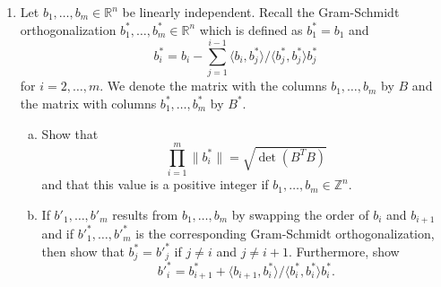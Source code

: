 \documentclass[12pt,a4paper]{article}
\begin{document}
\begin{enumerate}
\item Let  $b_1,\dots,b_m ∈ ℝ^n$  be linearly independent. Recall the Gram-Schmidt orthogonalization $b_1^*,\dots,b_m^* ∈ ℝ^n $ which is defined as $b_1^* = b_1$ and
  \begin{displaymath}
    b_i^* = b_i - ∑_{j=1}^{i-1} 〈b_i,b_j^*〉 / 〈b_j^*,b_j^*〉 b_j^* 
  \end{displaymath}
  for 
  $i=2,\dots,m$. We denote the matrix with the columns $b_1,\dots,b_m$  by $B$ and the matrix with columns $b_1^*,\dots,b_m^*$ by $B^*$.
  \begin{enumerate}[a)]
  \item Show that
    \begin{displaymath}
      ∏_{i=1}^m \|b_i^*\| = \sqrt{\det(B^T B)} 
    \end{displaymath}
    and that this value is a positive integer if  $b_1,\dots,b_m ∈ℤ^n$.
  \item If $b'_1,\dots,b'_m $ results from $b_1,\dots,b_m$ by swapping the order of $b_i$ and $b_{i+1}$ and  if ${b'}^*_1,\dots,{b'}^*_m $ is the corresponding Gram-Schmidt orthogonalization, then show that $b_j^*={b'}^*_j$ if $j≠i$ and $j ≠ i+1$. Furthermore, show
    \begin{displaymath}
     {b'}^*_i = b_{i+1}^* + 〈b_{i+1},b_i^*〉 / 〈b_i^*,b_i^*〉 b_i^*. 
    \end{displaymath}
  \end{enumerate}
  
\end{enumerate}
\end{document}

